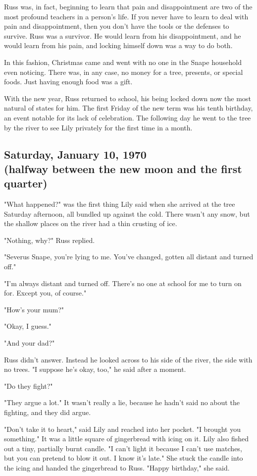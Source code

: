 Russ was, in fact, beginning to learn that pain and disappointment are two of the most profound teachers in a person's life. If you never have to learn to deal with pain and disappointment, then you don't have the tools or the defenses to survive. Russ was a survivor. He would learn from his disappointment, and he would learn from his pain, and locking himself down was a way to do both.

In this fashion, Christmas came and went with no one in the Snape household even noticing. There was, in any case, no money for a tree, presents, or special foods. Just having enough food was a gift.

With the new year, Russ returned to school, his being locked down now the most natural of states for him. The first Friday of the new term was his tenth birthday, an event notable for its lack of celebration. The following day he went to the tree by the river to see Lily privately for the first time in a month.

\subsection{Saturday, January 10, 1970 \\ (halfway between the new moon and the first quarter)}

"What happened?" was the first thing Lily said when she arrived at the tree Saturday afternoon, all bundled up against the cold. There wasn't any snow, but the shallow places on the river had a thin crusting of ice.

"Nothing, why?" Russ replied.

"Severus Snape, you're lying to me. You've changed, gotten all{\el} distant and turned off."

"I'm always distant and turned{\el} off. There's no one at school for me to{\el} turn on for. Except you, of course."

"How's your mum?"

"Okay, I guess."

"And your dad?"

Russ didn't answer. Instead he looked across to his side of the river, the side with no trees. "I suppose he's okay, too," he said after a moment.

"Do they fight?"

"They argue a lot." It wasn't really a lie, because he hadn't said no about the fighting, and they did argue.

"Don't take it to heart," said Lily and reached into her pocket. "I brought you something." It was a little square of gingerbread with icing on it. Lily also fished out a tiny, partially burnt candle. "I can't light it because I can't use matches, but you can pretend to blow it out. I know it's late." She stuck the candle into the icing and handed the gingerbread to Russ. "Happy birthday," she said.

